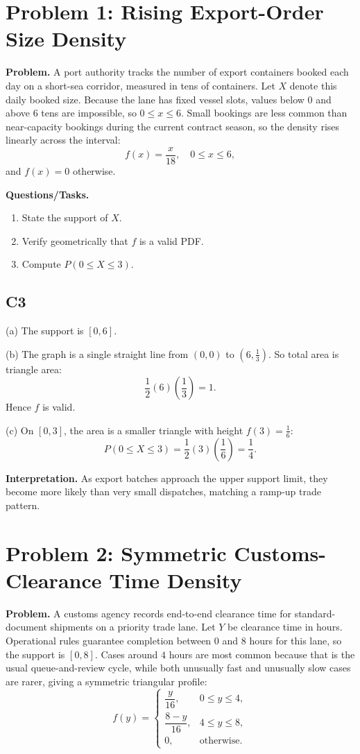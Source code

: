 \section{Problem 1: Rising Export-Order Size Density}

\textbf{Problem.}
A port authority tracks the number of export containers booked each day on a short-sea corridor, measured in tens of containers. Let $X$ denote this daily booked size. Because the lane has fixed vessel slots, values below $0$ and above $6$ tens are impossible, so $0\le x\le 6$. Small bookings are less common than near-capacity bookings during the current contract season, so the density rises linearly across the interval:
\[
f(x)=\frac{x}{18},\quad 0\le x\le 6,
\]
and $f(x)=0$ otherwise.

\textbf{Questions/Tasks.}
\begin{enumerate}[label=(\alph*)]
\item State the support of $X$.
\item Verify geometrically that $f$ is a valid PDF.
\item Compute $P(0\le X\le 3)$.
\end{enumerate}

\subsection*{C3}
(a) The support is $[0,6]$.

(b) The graph is a single straight line from $(0,0)$ to $(6,\tfrac13)$.
So total area is triangle area:
\[
\frac12(6)\left(\frac13\right)=1.
\]
Hence $f$ is valid.

(c) On $[0,3]$, the area is a smaller triangle with height $f(3)=\frac16$:
\[
P(0\le X\le 3)=\frac12(3)\left(\frac16\right)=\frac14.
\]

\textbf{Interpretation.}
As export batches approach the upper support limit, they become more likely than very small dispatches, matching a ramp-up trade pattern.

\section{Problem 2: Symmetric Customs-Clearance Time Density}

\textbf{Problem.}
A customs agency records end-to-end clearance time for standard-document shipments on a priority trade lane. Let $Y$ be clearance time in hours. Operational rules guarantee completion between $0$ and $8$ hours for this lane, so the support is $[0,8]$. Cases around $4$ hours are most common because that is the usual queue-and-review cycle, while both unusually fast and unusually slow cases are rarer, giving a symmetric triangular profile:
\[
f(y)=\begin{cases}
\dfrac{y}{16}, & 0\le y\le 4,\\
\dfrac{8-y}{16}, & 4\le y\le 8,\\
0, & \text{otherwise.}
\end{cases}
\]

